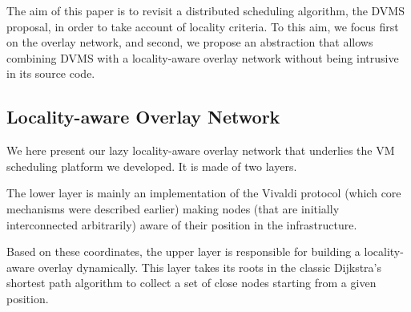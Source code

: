 The aim of this paper is to revisit a distributed scheduling algorithm, the DVMS
proposal, in order to take account of locality criteria.  To this aim, we focus
first on the overlay network, and second, we propose an abstraction that allows
combining DVMS with a locality-aware overlay network without being intrusive in
its source code.

\subsection{Locality-aware Overlay Network \label{ssec:lao}}

We here present our lazy locality-aware overlay network that underlies the VM
scheduling platform we developed. It is made of two layers.

The lower layer is
mainly an implementation of the Vivaldi protocol (which core mechanisms were
described earlier) making nodes (that are initially interconnected arbitrarily)
aware of their position in the infrastructure.

Based on these coordinates, the upper layer is responsible for building a
locality-aware overlay dynamically. This layer takes its roots in the classic
Dijkstra's shortest path algorithm to collect a set of close nodes starting from
a given position.







